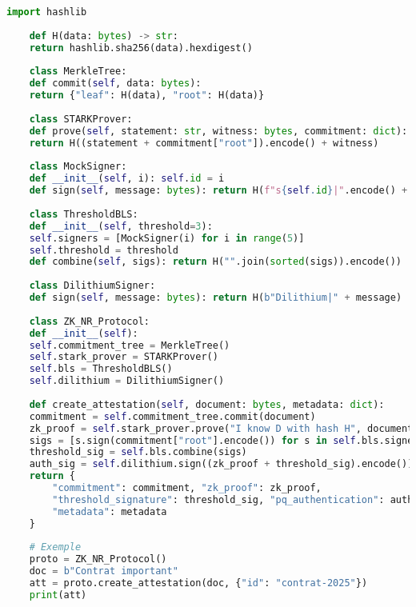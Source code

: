 \documentclass[12pt,a4paper]{report}
\begin{document}
\begin{lstlisting}[language=Python,caption={Version réduite du protocole ZK-NR simulé en Python}]
	import hashlib
	
	def H(data: bytes) -> str:
	return hashlib.sha256(data).hexdigest()
	
	class MerkleTree:
	def commit(self, data: bytes):
	return {"leaf": H(data), "root": H(data)}
	
	class STARKProver:
	def prove(self, statement: str, witness: bytes, commitment: dict):
	return H((statement + commitment["root"]).encode() + witness)
	
	class MockSigner:
	def __init__(self, i): self.id = i
	def sign(self, message: bytes): return H(f"s{self.id}|".encode() + message)
	
	class ThresholdBLS:
	def __init__(self, threshold=3): 
	self.signers = [MockSigner(i) for i in range(5)]
	self.threshold = threshold
	def combine(self, sigs): return H("".join(sorted(sigs)).encode())
	
	class DilithiumSigner:
	def sign(self, message: bytes): return H(b"Dilithium|" + message)
	
	class ZK_NR_Protocol:
	def __init__(self):
	self.commitment_tree = MerkleTree()
	self.stark_prover = STARKProver()
	self.bls = ThresholdBLS()
	self.dilithium = DilithiumSigner()
	
	def create_attestation(self, document: bytes, metadata: dict):
	commitment = self.commitment_tree.commit(document)
	zk_proof = self.stark_prover.prove("I know D with hash H", document, commitment)
	sigs = [s.sign(commitment["root"].encode()) for s in self.bls.signers[:3]]
	threshold_sig = self.bls.combine(sigs)
	auth_sig = self.dilithium.sign((zk_proof + threshold_sig).encode())
	return {
		"commitment": commitment, "zk_proof": zk_proof,
		"threshold_signature": threshold_sig, "pq_authentication": auth_sig,
		"metadata": metadata
	}
	
	# Exemple
	proto = ZK_NR_Protocol()
	doc = b"Contrat important"
	att = proto.create_attestation(doc, {"id": "contrat-2025"})
	print(att)
\end{lstlisting}




	
\end{document}
